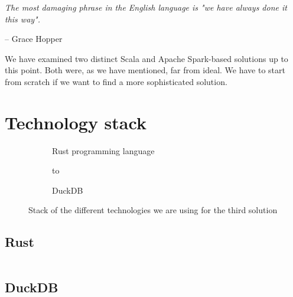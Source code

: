 \epigraph{\textit{The most damaging phrase in the English language is "we have always done it this way".}}{-- \textup{Grace Hopper}}

We have examined two distinct Scala and Apache Spark-based solutions up to this point. Both were, as we have mentioned, far from ideal. We have to start from scratch if we want to find a more sophisticated solution.

\section{Technology stack}

\begin{figure}[ht]
    \newsavebox\mybox

    \begin{subfigure}{.45\textwidth}
        \centering
        \usebox{\mybox}
        \caption{Rust programming language}
    \end{subfigure}%
    \hspace*{0.5em}
    \begin{subfigure}{.45\textwidth}
        \centering
        \vbox to \ht{}
        \caption{DuckDB}
    \end{subfigure}%
    \caption{Stack of the different technologies we are using for the third solution}
\end{figure}

\subsection{Rust}

\begin{code}
    \inputminted{rust}{code/listings/9-1_helloWorld.rs}
\end{code}

\subsection{DuckDB}